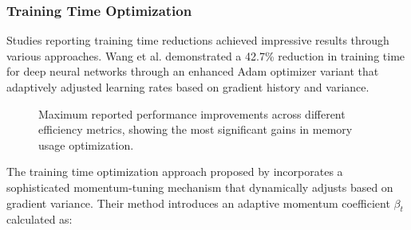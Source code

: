 \documentclass[acmsmall]{acmart}
\begin{document}
\subsubsection{Training Time Optimization}\label{subsubsec:performance-analysis-of-numerical-methods-rq12:training-time-optimization}
Studies reporting training time reductions achieved impressive results through various approaches. Wang et al. \citet{Wang2021} demonstrated a 42.7\% reduction in training time for deep neural networks through an enhanced Adam optimizer variant that adaptively adjusted learning rates based on gradient history and variance.

\begin{figure}[ht]
    \centering
    \caption{Maximum reported performance improvements across different efficiency metrics, showing the most significant gains in memory usage optimization.}
    \label{fig:efficiency_metrics:1}
\end{figure}

The training time optimization approach proposed by \citet{Wang2021} incorporates a sophisticated momentum-tuning mechanism that dynamically adjusts based on gradient variance. Their method introduces an adaptive momentum coefficient $\beta_t$ calculated as:
\end{document}
